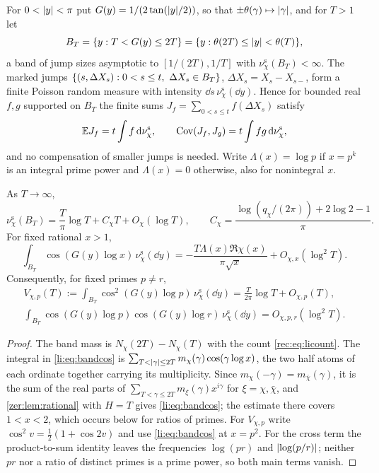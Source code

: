 For $0<\lvert y\rvert<\pi$ put $G(y)=1/(2\tan(\lvert y\rvert/2))$, so that $\pm\theta(\gamma)\mapsto\lvert\gamma\rvert$, and for $T>1$ let
\[
 B_T=\{y:T<G(y)\le2T\}=\{y:\theta(2T)\le\lvert y\rvert<\theta(T)\},
\]
a band of jump sizes asymptotic to $[1/(2T),1/T]$ with $\nu^{\mathrm s}_\chi(B_T)<\infty$. The marked jumps
$\{(s,\Delta X_s):0<s\le t,\ \Delta X_s\in B_T\}$, $\Delta X_s=X_s-X_{s-}$, form a finite Poisson random measure with
intensity $\dd s\,\nu^{\mathrm s}_\chi(\dd y)$. Hence for bounded real $f,g$ supported on $B_T$ the finite sums
$J_f=\sum_{0<s\le t}f(\Delta X_s)$ satisfy
\begin{equation}\label{li:eq:poisson}
 \mathbb{E} J_f=t\int f\,\mathrm{d}\nu^{\mathrm s}_\chi,\qquad\operatorname{Cov}(J_f,J_g)=t\int fg\,\mathrm{d}\nu^{\mathrm s}_\chi,
\end{equation}
and no compensation of smaller jumps is needed. Write $\Lambda(x)=\log p$ if $x=p^k$ is an integral prime
power and $\Lambda(x)=0$ otherwise, also for nonintegral $x$.

\begin{lemma}\label{li:lem:bands}
As $T\to\infty$,
\[
 \nu^{\mathrm s}_\chi(B_T)=\frac T\pi\log T+C_\chi T+O_\chi(\log T),\qquad C_\chi=\frac{\log(q_\chi/(2\pi))+2\log2-1}\pi.
\]
For fixed rational $x>1$,
\begin{equation}\label{li:eq:bandcos}
 \int_{B_T}\cos(G(y)\log x)\,\nu^{\mathrm s}_\chi(\dd y)=-\frac{T\Lambda(x)\Re\chi(x)}{\pi\sqrt x}+O_{\chi,x}(\log^2T).
\end{equation}
Consequently, for fixed primes $p\ne r$,
\begin{gather*}
 V_{\chi,p}(T):=\int_{B_T}\cos^2(G(y)\log p)\,\nu^{\mathrm s}_\chi(\dd y)=\frac T{2\pi}\log T+O_{\chi,p}(T),\\
 \int_{B_T}\cos(G(y)\log p)\cos(G(y)\log r)\,\nu^{\mathrm s}_\chi(\dd y)=O_{\chi,p,r}(\log^2T).
\end{gather*}
\end{lemma}

\begin{proof}
The band mass is $N_\chi(2T)-N_\chi(T)$ with the count \eqref{rec:eq:licount}. The integral
in \eqref{li:eq:bandcos} is $\sum_{T<\lvert\gamma\rvert\le2T}m_\chi(\gamma)\cos(\gamma\log x)$, the two half atoms of each ordinate
together carrying its multiplicity. Since $m_\chi(-\gamma)=m_{\bar\chi}(\gamma)$, it is the sum of the real parts of
$\sum_{T<\gamma\le2T}m_\xi(\gamma)x^{i\gamma}$ for $\xi=\chi,\bar\chi$, and \cref{zer:lem:rational} with $H=T$ gives
\eqref{li:eq:bandcos}; the estimate there covers $1<x<2$, which occurs below for ratios of primes. For
$V_{\chi,p}$ write $\cos^2v=\frac12(1+\cos2v)$ and use \eqref{li:eq:bandcos} at $x=p^2$. For the cross term the
product-to-sum identity leaves the frequencies $\log(pr)$ and $\lvert\log(p/r)\rvert$; neither $pr$ nor a ratio of
distinct primes is a prime power, so both main terms vanish.
\end{proof}

